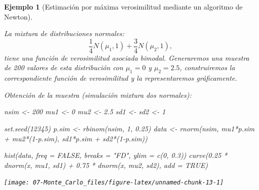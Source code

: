 \documentclass[
]{book}
\newenvironment{Shaded}{\begin{snugshade}}{\end{snugshade}}
\newcommand{\AttributeTok}[1]{\textcolor[rgb]{0.77,0.63,0.00}{#1}}
\newcommand{\ConstantTok}[1]{\textcolor[rgb]{0.00,0.00,0.00}{#1}}
\newcommand{\DecValTok}[1]{\textcolor[rgb]{0.00,0.00,0.81}{#1}}
\newcommand{\FloatTok}[1]{\textcolor[rgb]{0.00,0.00,0.81}{#1}}
\newcommand{\FunctionTok}[1]{\textcolor[rgb]{0.00,0.00,0.00}{#1}}
\newcommand{\NormalTok}[1]{#1}
\newcommand{\OtherTok}[1]{\textcolor[rgb]{0.56,0.35,0.01}{#1}}
\newcommand{\SpecialCharTok}[1]{\textcolor[rgb]{0.00,0.00,0.00}{#1}}
\newcommand{\StringTok}[1]{\textcolor[rgb]{0.31,0.60,0.02}{#1}}
\theoremstyle{break}
\newtheorem{example}{Ejemplo}[chapter]
\theoremstyle{nonumberplain}
\begin{document}
\begin{example}[Estimación por máxima verosimilitud mediante un algoritmo de Newton]
\protect\hypertarget{exm:mv-nlm}{}\label{exm:mv-nlm}

La mixtura de distribuciones normales:
\[\frac1{4}N(\mu_1,1)+\frac{3}{4}N(\mu_2,1),\]
tiene una función de verosimilitud asociada bimodal.
Generaremos una muestra de 200 valores de esta distribución con \(\mu_1=0\) y \(\mu_2=2.5\), construiremos la correspondiente función de verosimilitud y la representaremos gráficamente.

Obtención de la muestra (simulación mixtura dos normales):

\begin{Shaded}
\begin{Highlighting}[]
\NormalTok{nsim }\OtherTok{\textless{}{-}} \DecValTok{200}
\NormalTok{mu1 }\OtherTok{\textless{}{-}} \DecValTok{0} 
\NormalTok{mu2 }\OtherTok{\textless{}{-}} \FloatTok{2.5}
\NormalTok{sd1 }\OtherTok{\textless{}{-}}\NormalTok{ sd2 }\OtherTok{\textless{}{-}} \DecValTok{1}

\FunctionTok{set.seed}\NormalTok{(}\DecValTok{12345}\NormalTok{)}
\NormalTok{p.sim }\OtherTok{\textless{}{-}} \FunctionTok{rbinom}\NormalTok{(nsim, }\DecValTok{1}\NormalTok{, }\FloatTok{0.25}\NormalTok{)}
\NormalTok{data }\OtherTok{\textless{}{-}} \FunctionTok{rnorm}\NormalTok{(nsim, mu1}\SpecialCharTok{*}\NormalTok{p.sim }\SpecialCharTok{+}\NormalTok{ mu2}\SpecialCharTok{*}\NormalTok{(}\DecValTok{1}\SpecialCharTok{{-}}\NormalTok{p.sim), sd1}\SpecialCharTok{*}\NormalTok{p.sim }\SpecialCharTok{+}\NormalTok{ sd2}\SpecialCharTok{*}\NormalTok{(}\DecValTok{1}\SpecialCharTok{{-}}\NormalTok{p.sim))}

\FunctionTok{hist}\NormalTok{(data, }\AttributeTok{freq =} \ConstantTok{FALSE}\NormalTok{, }\AttributeTok{breaks =} \StringTok{"FD"}\NormalTok{, }\AttributeTok{ylim =} \FunctionTok{c}\NormalTok{(}\DecValTok{0}\NormalTok{, }\FloatTok{0.3}\NormalTok{))}
\FunctionTok{curve}\NormalTok{(}\FloatTok{0.25} \SpecialCharTok{*} \FunctionTok{dnorm}\NormalTok{(x, mu1, sd1) }\SpecialCharTok{+} \FloatTok{0.75} \SpecialCharTok{*} \FunctionTok{dnorm}\NormalTok{(x, mu2, sd2), }\AttributeTok{add =} \ConstantTok{TRUE}\NormalTok{)}
\end{Highlighting}
\end{Shaded}

\begin{center}\texttt{[image: 07-Monte\_Carlo\_files/figure-latex/unnamed-chunk-13-1]} \end{center}


\end{example}
\end{document}
